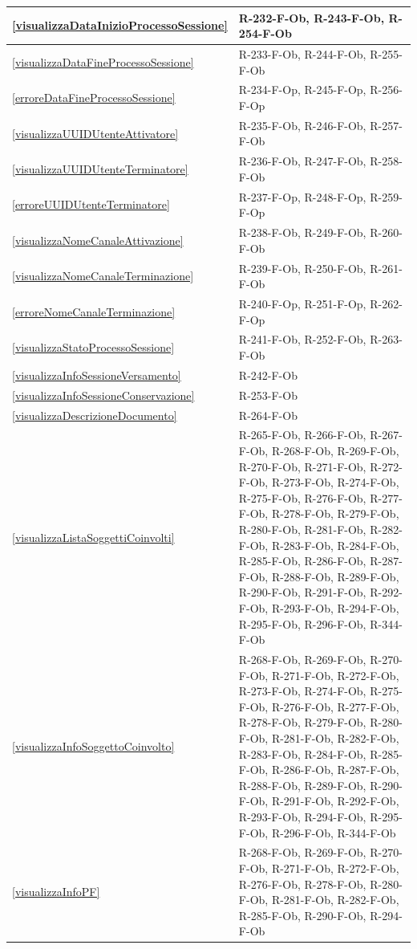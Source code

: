 \begin{longtable}{|p{4cm}|p{10cm}|}
\hline
\ref{visualizzaDataInizioProcessoSessione} & R-232-F-Ob, R-243-F-Ob, R-254-F-Ob \\
\hline
\ref{visualizzaDataFineProcessoSessione} & R-233-F-Ob, R-244-F-Ob, R-255-F-Ob \\
\hline
\ref{erroreDataFineProcessoSessione} & R-234-F-Op, R-245-F-Op, R-256-F-Op \\
\hline
\ref{visualizzaUUIDUtenteAttivatore} & R-235-F-Ob, R-246-F-Ob, R-257-F-Ob \\
\hline
\ref{visualizzaUUIDUtenteTerminatore} & R-236-F-Ob, R-247-F-Ob, R-258-F-Ob \\
\hline
\ref{erroreUUIDUtenteTerminatore} & R-237-F-Op, R-248-F-Op, R-259-F-Op \\
\hline
\ref{visualizzaNomeCanaleAttivazione} & R-238-F-Ob, R-249-F-Ob, R-260-F-Ob \\
\hline
\ref{visualizzaNomeCanaleTerminazione} & R-239-F-Ob, R-250-F-Ob, R-261-F-Ob \\
\hline
\ref{erroreNomeCanaleTerminazione} & R-240-F-Op, R-251-F-Op, R-262-F-Op \\
\hline
\ref{visualizzaStatoProcessoSessione} & R-241-F-Ob, R-252-F-Ob, R-263-F-Ob \\
\hline
\ref{visualizzaInfoSessioneVersamento} & R-242-F-Ob \\
\hline
\ref{visualizzaInfoSessioneConservazione} & R-253-F-Ob \\
\hline
\ref{visualizzaDescrizioneDocumento} & R-264-F-Ob \\
\hline
\ref{visualizzaListaSoggettiCoinvolti} & R-265-F-Ob, R-266-F-Ob, R-267-F-Ob, R-268-F-Ob, R-269-F-Ob, R-270-F-Ob, R-271-F-Ob, R-272-F-Ob, R-273-F-Ob, R-274-F-Ob, R-275-F-Ob, R-276-F-Ob, R-277-F-Ob, R-278-F-Ob, R-279-F-Ob, R-280-F-Ob, R-281-F-Ob, R-282-F-Ob, R-283-F-Ob, R-284-F-Ob, R-285-F-Ob, R-286-F-Ob, R-287-F-Ob, R-288-F-Ob, R-289-F-Ob, R-290-F-Ob, R-291-F-Ob, R-292-F-Ob, R-293-F-Ob, R-294-F-Ob, R-295-F-Ob, R-296-F-Ob, R-344-F-Ob \\
\hline
\ref{visualizzaInfoSoggettoCoinvolto} & R-268-F-Ob, R-269-F-Ob, R-270-F-Ob, R-271-F-Ob, R-272-F-Ob, R-273-F-Ob, R-274-F-Ob, R-275-F-Ob, R-276-F-Ob, R-277-F-Ob, R-278-F-Ob, R-279-F-Ob, R-280-F-Ob, R-281-F-Ob, R-282-F-Ob, R-283-F-Ob, R-284-F-Ob, R-285-F-Ob, R-286-F-Ob, R-287-F-Ob, R-288-F-Ob, R-289-F-Ob, R-290-F-Ob, R-291-F-Ob, R-292-F-Ob, R-293-F-Ob, R-294-F-Ob, R-295-F-Ob, R-296-F-Ob, R-344-F-Ob \\
\hline
\ref{visualizzaInfoPF} & R-268-F-Ob, R-269-F-Ob, R-270-F-Ob, R-271-F-Ob, R-272-F-Ob, R-276-F-Ob, R-278-F-Ob, R-280-F-Ob, R-281-F-Ob, R-282-F-Ob, R-285-F-Ob, R-290-F-Ob, R-294-F-Ob \\

\end{longtable}
